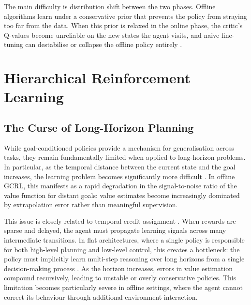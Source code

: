The main difficulty is distribution shift between the two phases. Offline algorithms learn under a conservative prior that prevents the policy from straying too far from the data. When this prior is relaxed in the online phase, the critic's Q-values become unreliable on the new states the agent visits, and naive fine-tuning can destabilise or collapse the offline policy entirely \cite{nair2021awacacceleratingonlinereinforcement, nakamoto2024calqlcalibratedofflinerl}.


\section{Hierarchical Reinforcement Learning}

\subsection{The Curse of Long-Horizon Planning}

While goal-conditioned policies provide a mechanism for generalisation across tasks, they remain fundamentally limited when applied to long-horizon problems. In particular, as the temporal distance between the current state and the goal increases, the learning problem becomes significantly more difficult \cite{SUTTON1999181, nachum2018dataefficienthierarchicalreinforcementlearning}. In offline GCRL, this manifests as a rapid degradation in the signal-to-noise ratio of the value function for distant goals: value estimates become increasingly dominated by extrapolation error rather than meaningful supervision.

This issue is closely related to temporal credit assignment \cite{sutton2018reinforcement}. When rewards are sparse and delayed, the agent must propagate learning signals across many intermediate transitions. In flat architectures, where a single policy is responsible for both high-level planning and low-level control, this creates a bottleneck: the policy must implicitly learn multi-step reasoning over long horizons from a single decision-making process \cite{vezhnevets2017feudalnetworkshierarchicalreinforcement, nachum2018dataefficienthierarchicalreinforcementlearning}. As the horizon increases, errors in value estimation compound recursively, leading to unstable or overly conservative policies. This limitation becomes particularly severe in offline settings, where the agent cannot correct its behaviour through additional environment interaction.

